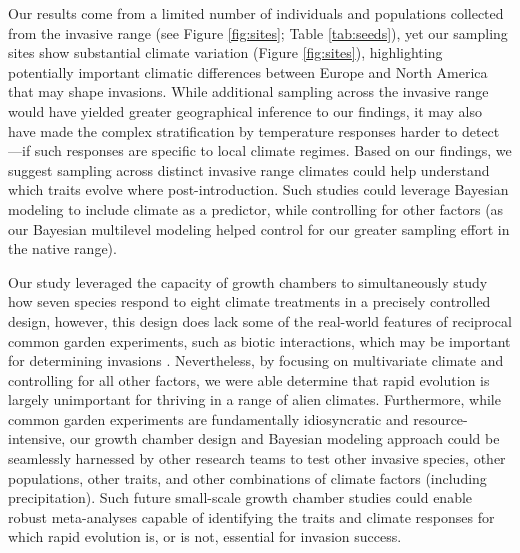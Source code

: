 \documentclass[12pt]{article}\usepackage[]{graphicx}\usepackage[]{color}
\begin{document}
	Our results come from a limited number of individuals and populations collected from the invasive range (see Figure \ref{fig:sites}; Table \ref{tab:seeds}), yet our sampling sites show substantial climate variation (Figure \ref{fig:sites}), highlighting potentially important climatic differences between Europe and North America that may shape invasions. While additional sampling across the invasive range would have yielded greater geographical inference to our findings, it may also have made the complex stratification by temperature responses harder to detect---if such responses are specific to local climate regimes. Based on our findings, we suggest sampling across distinct invasive range climates could help understand which traits evolve where post-introduction. Such studies could leverage Bayesian modeling to include climate as a predictor, while controlling for other factors (as our Bayesian multilevel modeling helped control for our greater sampling effort in the native range). 
	
	Our study leveraged the capacity of growth chambers to simultaneously study how seven species respond to eight climate treatments in a precisely controlled design, however, this design does lack some of the real-world features of reciprocal common garden experiments, such as biotic interactions, which may be important for determining invasions \parencite{Germain2018,Blois2013}.  Nevertheless, by focusing on multivariate climate and controlling for all other factors, we were able determine that rapid evolution is largely unimportant for thriving in a range of alien climates. Furthermore, while common garden experiments are fundamentally idiosyncratic and resource-intensive, our growth chamber design and Bayesian modeling approach could be seamlessly harnessed by other research teams to test other invasive species, other populations, other traits, and other combinations of climate factors (including precipitation). Such future small-scale growth chamber studies could enable robust meta-analyses capable of identifying the traits and climate responses for which rapid evolution is, or is not, essential for invasion success. 
	
\end{document}
